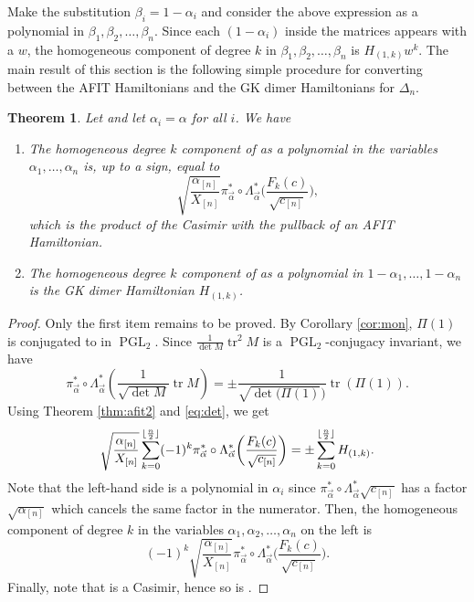 \documentclass[pdftex]{sigma}
\numberwithin{equation}{section}
\newtheorem{Theorem}{Theorem}[section]
\DeclarePairedDelimiter\floor{\lfloor}{\rfloor}
\newcommand{\PGL}{\operatorname{PGL}}
\newcommand{\la}{\label}
\DeclareMathOperator{\tr}{tr}
\begin{document}
	
	Make the substitution $\beta_i=1-\alpha_i$ and consider the above expression as a polynomial in $\beta_1,\beta_2,\dots,\beta_{n}$. Since each $(1-\alpha_i)$ inside the matrices appears with a $w$, the homogeneous component of degree $k$ in $\beta_1,\beta_2,\dots,\beta_{n}$ is $H_{(1,k)} w^{k}$. The main result of this section is the following simple procedure for converting between the AFIT Hamiltonians \cite{AFIT} and the GK dimer Hamiltonians for $\Delta_n$.
	\begin{Theorem}%
		Let  and let $\alpha_i=\alpha$ for all $i$. We have
		\begin{enumerate}\itemsep=0pt
			\item[$1.$] The homogeneous degree $k$ component of  as a polynomial in the variables $\alpha_1,\dots,\alpha_n$ is, up to a sign, equal to
\[
\sqrt{ \frac{\alpha_{[n]}}{X_{[n]}}} \pi_{\vec \alpha}^* \circ \Lambda_{\vec \alpha}^*\biggl(\frac{F_k(c)}{\sqrt{c_{[n]}}}\biggr),
\]
which is the product of the Casimir  with the pullback of an AFIT Hamiltonian.
			\item[$2.$] The homogeneous degree $k$ component of  as a polynomial in $1-\alpha_1,\dots,\allowbreak{1-\alpha_n}$ is the GK dimer Hamiltonian $H_{(1,k)}$.
		\end{enumerate}
	\end{Theorem}
	
	\begin{proof}
		
		Only the first item remains to be proved. By Corollary \ref{cor:mon}, $\Pi(1)$ is conjugated to  in $\PGL_2$. Since $\frac{1}{\det M}\tr^2 M$ is a $\PGL_2$-conjugacy invariant, we have
		\[
		\pi_{\vec \alpha}^* \circ \Lambda_{\vec \alpha}^* \left(\frac{1}{\sqrt{\det M}}\tr M \right)=\pm \frac{1}{\sqrt{\det (\Pi(1)})}\tr( \Pi(1)) .
		\]
		Using Theorem \ref{thm:afit2} and \eqref{eq:det}, we get
		\[
		\sqrt{ \frac{\alpha_{[n]}}{X_{[n]}}} \sum_{k=0}^{\floor{\frac n 2}} (-1)^k \pi_{\vec \alpha}^* \circ \Lambda_{\vec \alpha}^*\biggl(\frac{F_k(c)}{\sqrt{c_{[n]}}}\biggr)=\pm \sum_{k=0}^{\floor{\frac n 2}}H_{(1,k)}.
		\]
		Note that the left-hand side is a polynomial in $\alpha_i$ since $\pi_{\vec \alpha}^* \circ \Lambda_{\vec \alpha}^*\sqrt{c_{[n]}}$ has a factor $\sqrt{\alpha_{[n]}}$ which cancels the same factor in the numerator. Then, the homogeneous component of degree $k$ in the variables $\alpha_1, \alpha_2, \dots,\alpha_{n}$ on the left is
\[
(-1)^k \sqrt{ \frac{\alpha_{[n]}}{X_{[n]}}} \pi_{\vec \alpha}^* \circ \Lambda_{\vec \alpha}^*\biggl(\frac{F_k(c)}{\sqrt{c_{[n]}}}\biggr).
\]
		Finally, note that  is a Casimir, hence so is .
	\end{proof}
	
\end{document}
